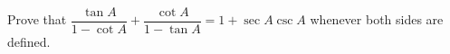 Prove that $\dfrac{\tan A}{1-\cot A}+\dfrac{\cot A}{1-\tan A}=1+\sec A\csc A$ whenever both sides are defined.
